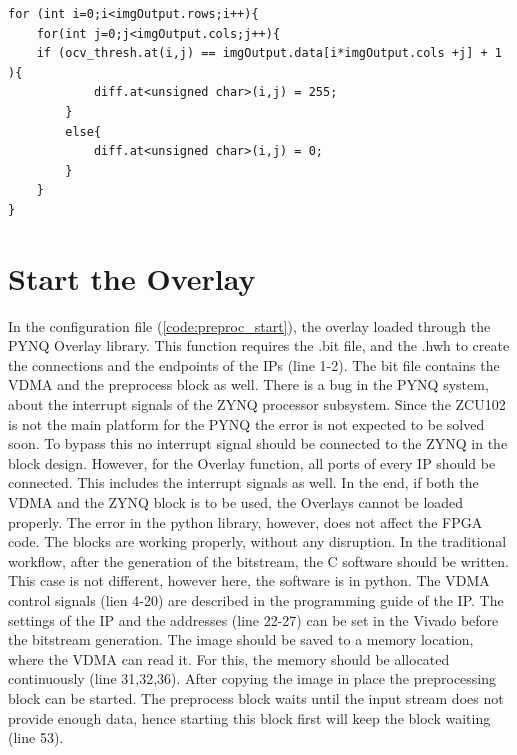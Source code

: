 \begin{lstlisting}
for (int i=0;i<imgOutput.rows;i++){
	for(int j=0;j<imgOutput.cols;j++){
	if (ocv_thresh.at(i,j) == imgOutput.data[i*imgOutput.cols +j] + 1 ){
			diff.at<unsigned char>(i,j) = 255;
		}
		else{
			diff.at<unsigned char>(i,j) = 0;
		}
	}
}
\end{lstlisting}

\clearpage

\section{Start the Overlay} %
In the configuration file (\cref{code:preproc_start}), the overlay loaded through the PYNQ Overlay library.
This function requires the .bit file, and the .hwh to create the connections and the endpoints of the IPs (line 1-2).
The bit file contains the VDMA and the preprocess block as well.
There is a bug in the PYNQ system, about the interrupt signals of the ZYNQ processor subsystem.
Since the ZCU102 is not the main platform for the PYNQ the error is not expected to be solved soon.
To bypass this no interrupt signal should be connected to the ZYNQ in the block design.
However, for the Overlay function, all ports of every IP should be connected.
This includes the interrupt signals as well.
In the end, if both the VDMA and the ZYNQ block is to be used, the Overlays cannot be loaded properly.
The error in the python library, however, does not affect the FPGA code.
The blocks are working properly, without any disruption.
In the traditional workflow, after the generation of the bitstream, the C software should be written.
This case is not different, however here, the software is in python.
The VDMA control signals (lien 4-20) are described in the programming guide of the IP.
The settings of the IP and the addresses (line 22-27) can be set in the Vivado before the bitstream generation.
The image should be saved to a memory location, where the VDMA can read it.
For this, the memory should be allocated continuously (line 31,32,36).
After copying the image in place the preprocessing block can be started.
The preprocess block waits until the input stream does not provide enough data, hence starting this block first will keep the block waiting (line 53).

